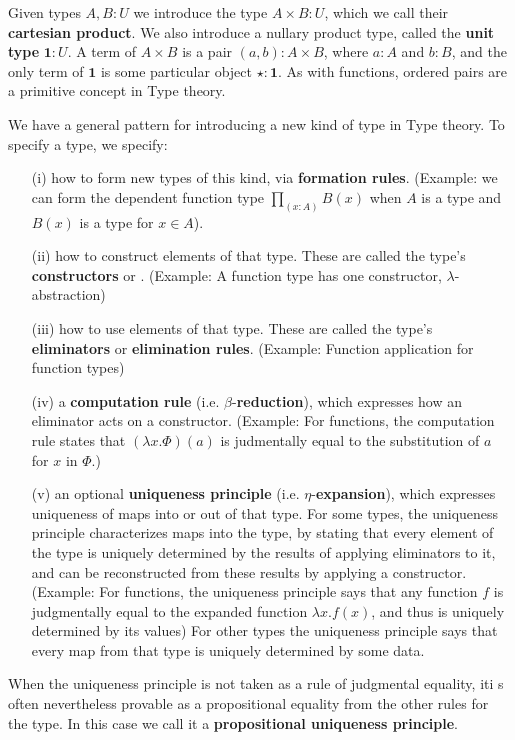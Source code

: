 Given types $A,B:U$ we introduce the type $A\times B:U$, which we call their \textbf{cartesian product}. We also introduce a nullary product type, called the \textbf{unit type} $\mathbf{1}:U$. A term of $A\times B$ is a pair $(a,b) : A\times B$, where $a:A$ and $b:B$, and the only term of $\mathbf{1}$ is some particular object $\star:\mathbf{1}$. As with functions, ordered pairs are a primitive concept in Type theory.

\begin{remark}
    We have a general pattern for introducing a new kind of type in Type theory. To specify a type, we specify: \begin{itemize}
        \item[(i)] how to form new types of this kind, via \textbf{formation rules}. (Example: we can form the dependent function type $\prod_{(x:A)}B(x)$ when $A$ is a type and $B(x)$ is a type for $x \in A$).
        \item[(ii)] how to construct elements of that type. These are called the type's \textbf{constructors} or . (Example: A function type has one constructor, $\lambda$-abstraction)
        \item[(iii)] how to use elements of that type. These are called the type's \textbf{eliminators} or \textbf{elimination rules}. (Example: Function application for function types)
        \item[(iv)] a \textbf{computation rule} (i.e. $\beta$-\textbf{reduction}), which expresses how an eliminator acts on a constructor. (Example: For functions, the computation rule states that $(\lambda x.\Phi)(a)$ is judmentally equal to the substitution of $a$ for $x$ in $\Phi$.)
        \item[(v)] an optional \textbf{uniqueness principle} (i.e. $\eta$-\textbf{expansion}), which expresses uniqueness of maps into or out of that type. For some types, the uniqueness principle characterizes maps into the type, by stating that every element of the type is uniquely determined by the results of applying eliminators to it, and can be reconstructed from these results by applying a constructor. (Example: For functions, the uniqueness principle says that any function $f$ is judgmentally equal to the expanded function $\lambda x.f(x)$, and thus is uniquely determined by its values) For other types the uniqueness principle says that every map from that type is uniquely determined by some data.
    \end{itemize}

    When the uniqueness principle is not taken as a rule of judgmental equality, iti s often nevertheless provable as a propositional equality from the other rules for the type. In this case we call it a \textbf{propositional uniqueness principle}.
\end{remark}

